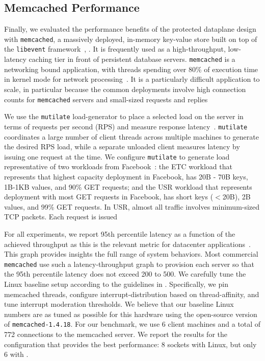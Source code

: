 
\subsection{Memcached Performance}
\label{sec:eval:memcached}




Finally, we evaluated the performance benefits of the \ix protected
dataplane design with \texttt{memcached}, a massively deployed,
in-memory key-value store built on top of the \texttt{libevent}
framework~\cite{url:memcached}, . It is frequently used as a
high-throughput, low-latency caching tier in front of persistent
database servers. \texttt{memcached} is a networking bound
application, with threads spending over 80\% of execution time in
kernel mode for network processing~\cite{Leverich:RHSU:2014}. It is a
particularly difficult application to scale, in particular because the
common deployments involve high connection counts for
\texttt{memcached} servers and small-sized requests and
replies~\cite{nishtala2013scaling,Atikoglu:2012:WAL}

We use the \texttt{mutilate} load-generator to place a selected load
on the server in terms of requests per second (RPS) and measure
response latency~\cite{url:mutilate}. \texttt{mutilate} coordinates a
large number of client threads across multiple machines to generate
the desired RPS load, while a separate unloaded client measures
latency by issuing one request at the time.  We configure
\texttt{mutilate} to generate load representative of two workloads
from Facebook~\cite{Atikoglu:2012:WAL}: the ETC workload that
represents that highest capacity deployment in Facebook, has 20B - 70B
keys, 1B-1KB values, and 90\% GET requests; and the USR workload that
represents deployment with most GET requests in Facebook, has short
keys ($<$20B), 2B values, and 99\% GET requests. In USR, almost all
traffic involves minimum-sized TCP packets. Each request is issued 

For all experiments, we report 95th percentile latency as a function
of the achieved throughput as this is the relevant metric for
datacenter
applications\microsecond~\cite{DBLP:journals/cacm/DeanB13}. This graph
provides insights the full range of system behaviors. Most commercial
\texttt{memcached} use such a latency-throughput graph to provision
each server so that the 95th percentile latency does not exceed 200 to
500.  We carefully tune the Linux baseline setup according to the
guidelines in \cite{Leverich:RHSU:2014}. Specifically, we pin
memcached threads, configure interrupt-distribution based on
thread-affinity, and tune interrupt moderation thresholds. We believe
that our baseline Linux numbers are as tuned as possible for this
hardware using the open-source version of
\texttt{memcached-1.4.18}. For our benchmark, we use 6 client machines
and a total of 772 connections to the memcached server. We report the
results for the configuration that provides the best performance: 
8 sockets with Linux, but only 6 with \ix.


